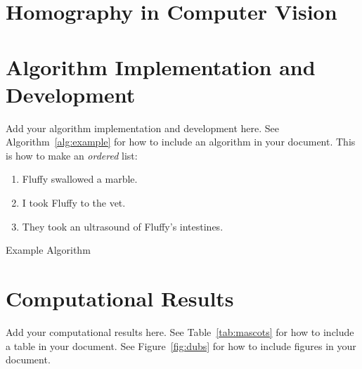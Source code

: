 \documentclass{article}
\begin{document}
\section{Homography in Computer Vision}
\section{Algorithm Implementation and Development}
Add your algorithm implementation and development here. See Algorithm~\ref{alg:example} for how to include an algorithm in your document. This is how to make an \textit{ordered} list:
\begin{enumerate}
    \item Fluffy swallowed a marble.
    \item I took Fluffy to the vet.
    \item They took an ultrasound of Fluffy's intestines.
\end{enumerate}

\begin{algorithm}
\begin{algorithmic}
    \ENDFOR
    \ELSE
        \ENDIF
    \ENDIF 
\end{algorithmic}
\caption{Example Algorithm}
\label{alg:example}
\end{algorithm}

\section{Computational Results}
Add your computational results here. See Table~\ref{tab:mascots} for how to include a table in your document. See Figure~\ref{fig:dubs} for how to include figures in your document.
\end{document}
